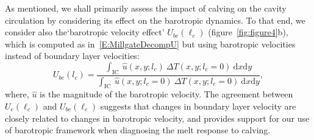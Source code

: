 \documentclass[draft]{agujournal2019}
\begin{document}
As mentioned, we shall primarily assess the impact of calving on the cavity circulation by considering its effect on the barotropic dynamics. To that end, we consider also the`barotropic velocity effect' $U_{be}(\ell_c)$ (figure~\ref{fig:figure4}b), which is computed as in~\eqref{E:MillgateDecompU} but using barotropic velocities instead of boundary layer velocities:
\begin{equation}\label{E:MillgateDecompUbaro}
    U_{be}(l_c)  =  \frac{\int_{\text{IC}}~\hat{u}(x,y; l_c)~\Delta T(x,y;l_c = 0)~\mathrm{d}x\mathrm{d}y}{\int_{\text{IC}}~ \hat{u}(x,y; l_c = 0)~\Delta T(x,y;l_c = 0)~\mathrm{d}x\mathrm{d}y},
\end{equation}
where, $\hat{u}$ is the magnitude of the barotropic velocity. The agreement between $U_e(\ell_c)$ and $U_{be}(\ell_c)$ suggests that changes in boundary layer velocity are closely related to changes in barotropic velocity, and provides support for our use of barotropic framework when diagnosing the melt response to calving.  %
\end{document}
